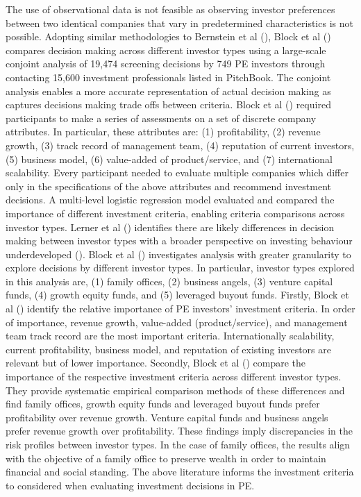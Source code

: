 \documentclass[12pt]{article}
\begin{document}
The use of observational data is not feasible as observing investor preferences between two identical companies that vary in predetermined characteristics is not possible.
Adopting similar methodologies to Bernstein et al (\citeyear{bernstein2017attracting}), Block et al (\citeyear{BLOCK2019329}) compares 
decision making across different investor types using a large-scale conjoint analysis of 19,474 screening decisions by 749 PE investors
through contacting 15,600 investment professionals listed in PitchBook. 
The conjoint analysis enables a more accurate representation of actual decision making as captures decisions making trade offs between criteria.
Block et al (\citeyear{BLOCK2019329}) required participants to make a series of assessments on a set of discrete company attributes. 
In particular, these attributes are: (1) profitability, (2) revenue growth, (3) track record of management team, (4) reputation of current investors, (5) business model, (6) value-added of product/service, and (7) international scalability.
Every participant needed to evaluate multiple companies which differ only in the specifications of the above attributes and recommend investment decisions.
A multi-level logistic regression model evaluated and compared the importance of different investment criteria, enabling criteria comparisons across investor types.
Lerner et al (\cite{lerner2007smart}) identifies there are likely differences in decision making between investor types with a broader perspective on investing behaviour underdeveloped (\cite{hellmann2013angels}).
Block et al (\citeyear{BLOCK2019329}) investigates analysis with greater granularity to explore decisions by different investor types. 
In particular, investor types explored in this analysis are, (1) family offices, (2) business angels, (3) venture capital funds, (4) growth equity funds, and (5) leveraged buyout funds.
Firstly, Block et al (\citeyear{BLOCK2019329}) identify the relative importance of PE investors' investment criteria.
In order of importance, revenue growth, value-added (product/service), and management team track record are the most important criteria.
Internationally scalability, current profitability, business model, and reputation of existing investors are relevant but of lower importance.
Secondly, Block et al (\citeyear{BLOCK2019329}) compare the importance of the respective investment criteria across different investor types.
They provide systematic empirical comparison methods of these differences and find family offices, growth equity funds and leveraged buyout funds prefer profitability over revenue growth. 
Venture capital funds and business angels prefer revenue growth over profitability.
These findings imply discrepancies in the risk profiles between investor types.
In the case of family offices, the results align with the objective of a family office to preserve wealth in order to maintain financial and social standing.
The above literature informs the investment criteria to considered when evaluating investment decisions in PE.
\end{document}

